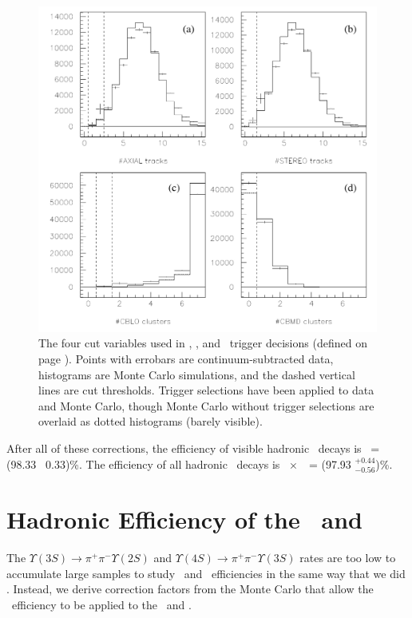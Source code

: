 \documentclass{cornell}
\begin{document}
\begin{figure}[p]
  \begin{center}
    \includegraphics[width=\linewidth]{plots/triggeragreement}
  \end{center}
  \caption{\label{triggeragreement} The four cut variables used in
  \hadron, \radtau, and \eltrack\ trigger decisions (defined on page
  \pageref{pag:triggerdefs}).  Points with errobars are
  continuum-subtracted data, histograms are Monte Carlo simulations,
  and the dashed vertical lines are cut thresholds.  Trigger
  selections have been applied to data and Monte Carlo, though Monte
  Carlo without trigger selections are overlaid as dotted histograms
  (barely visible).}
\end{figure}

After all of these corrections, the efficiency of visible hadronic
\us\ decays is \ecuts\ = (98.33 \PM\ 0.33)\%.  The efficiency of all
hadronic \us\ decays is \evis~$\times$~\ecuts\ = (97.93
$^{+0.44}_{-0.56}$)\%.

\section{Hadronic Efficiency of the \boldmath \uss\ and \usss}
\label{sec:ussusssefficiency}

The $\Upsilon(3S) \to \pi^+\pi^- \Upsilon(2S)$ and $\Upsilon(4S) \to
\pi^+\pi^- \Upsilon(3S)$ rates are too low to accumulate large samples
to study \uss\ and \usss\ efficiencies in the same way that we did
\us.  Instead, we derive correction factors from the Monte Carlo that
allow the \us\ efficiency to be applied to the \uss\ and \usss.
\end{document}
